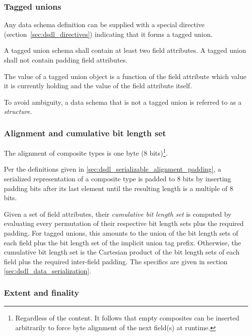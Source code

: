 \subsubsection{Tagged unions}\label{sec:dsdl_composite_tagged_unions}

Any data schema definition can be supplied with a special directive (section~\ref{sec:dsdl_directives})
indicating that it forms a tagged union.

A tagged union schema shall contain at least two field attributes.
A tagged union shall not contain padding field attributes.

The value of a tagged union object is a function of the field attribute which value it is currently holding
and the value of the field attribute itself.

To avoid ambiguity, a data schema that is not a tagged union is referred to as a \emph{structure}.

\subsubsection{Alignment and cumulative bit length set}\label{sec:dsdl_composite_alignment_cumulative_bls}

The alignment of composite types is one byte (8 bits)\footnote{%
    Regardless of the content.
    It follows that empty composites can be inserted arbitrarily to force byte alignment
    of the next field(s) at runtime.
}.

Per the definitions given in \ref{sec:dsdl_serializable_alignment_padding},
a serialized representation of a composite type is padded to 8 bits by inserting padding bits
after its last element until the resulting length is a multiple of 8 bits.

Given a set of field attributes, their \emph{cumulative bit length set} is computed
by evaluating every permutation of their respective bit length sets plus the required padding.
For tagged unions, this amounts to the union of the bit length sets of each field
plus the bit length set of the implicit union tag prefix.
Otherwise, the cumulative bit length set is the Cartesian product of the bit length sets of each field
plus the required inter-field padding.
The specifics are given in section \ref{sec:dsdl_data_serialization}.

\subsubsection{Extent and finality}\label{sec:dsdl_composite_extent_and_finality}

